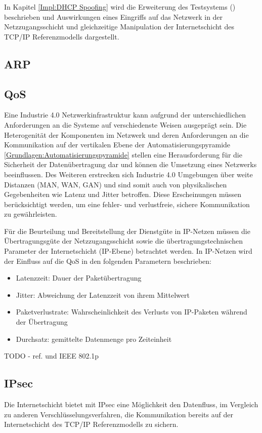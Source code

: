 In Kapitel \autoref{Impl:DHCP Spoofing} wird die Erweiterung des Testsystems (\cite{Weber2018}) beschrieben und Auswirkungen eines Eingriffs auf das Netzwerk in der Netzzugangsschicht und gleichzeitige Manipulation der Internetschicht des \ac{TCP}/\ac{IP} Referenzmodells dargestellt.

\subsection{ARP}



\subsection{\ac{QoS}}
Eine Industrie 4.0 Netzwerkinfrastruktur kann aufgrund der unterschiedlichen Anforderungen an die Systeme auf verschiedenste Weisen ausgeprägt sein. Die Heterogenität der Komponenten im Netzwerk und deren Anforderungen an die Kommunikation auf der vertikalen Ebene der Automatisierungspyramide \autoref{Grundlagen:Automatisierungspyramide} stellen eine Herausforderung für die Sicherheit der Datenübertragung dar und können die Umsetzung eines Netzwerks beeinflussen. Des Weiteren erstrecken sich Industrie 4.0 Umgebungen über weite Distanzen (\ac{MAN}, \ac{WAN}, \ac{GAN}) und sind somit auch von physikalischen Gegebenheiten wie Latenz und Jitter betroffen. Diese Erscheinungen müssen berücksichtigt werden, um eine fehler- und verlustfreie, sichere Kommunikation zu gewährleisten.

Für die Beurteilung und Bereitstellung der Dienstgüte in \ac{IP}-Netzen müssen die Übertragungsgüte der Netzzugangsschicht sowie die übertragungstechnischen Parameter der Internetschicht (\ac{IP}-Ebene) betrachtet werden. In IP-Netzen wird der Einfluss auf die \ac{QoS} in den folgenden Parametern beschrieben:
\begin{itemize}
    \item Latenzzeit: Dauer der Paketübertragung
    \item Jitter: Abweichung der Latenzzeit von ihrem Mittelwert
    \item Paketverlustrate: Wahrscheinlichkeit des Verlusts von IP-Paketen während der Übertragung
    \item Durchsatz: gemittelte Datenmenge pro Zeiteinheit
\end{itemize}

TODO - ref. \cite{torscht2014} und IEEE 802.1p

\subsection{IPsec}
Die Internetschicht bietet mit IPsec eine Möglichkeit den Datenfluss, im Vergleich zu anderen Verschlüsselungsverfahren, die Kommunikation bereits auf der Internetschicht des \ac{TCP}/\ac{IP} Referenzmodells zu sichern.

